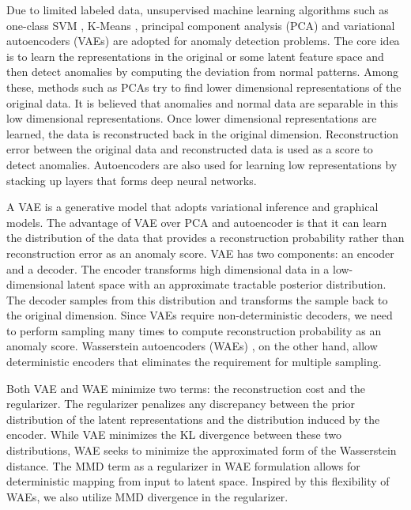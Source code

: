 \documentclass{article}
\theoremstyle{plain}
\theoremstyle{definition}
\begin{document}
Due to limited labeled data, unsupervised machine learning algorithms such as one-class SVM \cite{erfani2016high}, K-Means \cite{munz2007traffic}, principal component analysis (PCA) \cite{chandola2007outlier} and variational autoencoders (VAEs) \cite{an2015variational} are adopted for anomaly detection problems. The core idea is to learn the representations in the original or some latent feature space and then detect anomalies by computing the deviation from normal patterns. Among these, methods such as PCAs try to find lower dimensional representations of the original data. It is believed that anomalies and normal data are separable in this low dimensional representations. Once lower dimensional representations are learned, the data is reconstructed back in the original dimension. Reconstruction error between the original data and reconstructed data is used as a score to detect anomalies. Autoencoders are also used for learning low representations by stacking up layers that forms deep neural networks.

A VAE \cite{kingma2013auto} is a generative model that adopts variational inference and graphical models. The advantage of VAE over PCA and autoencoder is that it can learn the distribution of the data that provides a reconstruction probability rather than reconstruction error as an anomaly score. VAE has two components: an encoder and a decoder. The encoder transforms high dimensional data in a low-dimensional latent space with an approximate tractable posterior distribution. The decoder samples from this distribution and transforms the sample back to the original dimension. Since VAEs require non-deterministic decoders, we need to perform sampling many times to compute reconstruction probability as an anomaly score. Wasserstein autoencoders (WAEs) \cite{tolstikhin2017wasserstein}, on the other hand, allow deterministic encoders that eliminates the requirement for multiple sampling. 

Both VAE and WAE minimize two terms: the reconstruction cost and the regularizer. The regularizer penalizes any discrepancy between the prior distribution of the latent representations and the distribution induced by the encoder. While VAE minimizes the KL divergence between these two distributions, WAE seeks to minimize the approximated form of the Wasserstein distance. The MMD term as a regularizer in WAE formulation allows for deterministic mapping from input to latent space. Inspired by this flexibility of WAEs, we also utilize MMD divergence in the regularizer.
\end{document}
